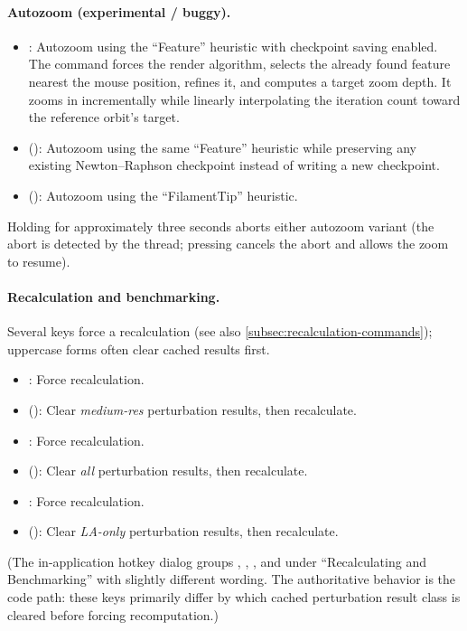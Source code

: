 \paragraph{Autozoom (experimental / buggy).}
\label{par:autozoom}

\begin{itemize}
  \item {}: Autozoom using the ``Feature'' heuristic with checkpoint
        saving enabled.  The command forces the
         render algorithm, selects the already
        found feature nearest the mouse position, refines it, and computes
        a target zoom depth. It zooms in incrementally while
        linearly interpolating the iteration count toward the reference orbit's
        target.
  \item {} (): Autozoom using the same ``Feature''
        heuristic while preserving any existing Newton--Raphson checkpoint
        instead of writing a new checkpoint.
  \item {} (): Autozoom using the ``FilamentTip'' heuristic.
\end{itemize}
Holding  for approximately three seconds aborts either
autozoom variant (the abort is detected by the  thread;
pressing  cancels the abort and allows the zoom to resume).

\paragraph{Recalculation and benchmarking.}
Several keys force a recalculation (see also
\cref{subsec:recalculation-commands}); uppercase forms often clear cached
results first.
\begin{itemize}
  \item {}: Force recalculation.
  \item {} (): Clear \emph{medium-res} perturbation results, then recalculate.
  \item {}: Force recalculation.
  \item {} (): Clear \emph{all} perturbation results, then recalculate.
  \item {}: Force recalculation.
  \item {} (): Clear \emph{LA-only} perturbation results, then recalculate.
\end{itemize}
(The in-application hotkey dialog groups , ,
, and  under ``Recalculating and Benchmarking'' with
slightly different wording.  The authoritative behavior is the code path: these
keys primarily differ by which cached perturbation result class is cleared
before forcing recomputation.)

